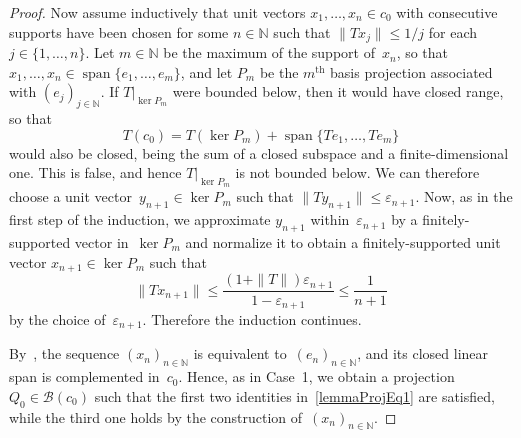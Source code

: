 \documentclass[12pt]{amsart}
\theoremstyle{definition}
\numberwithin{equation}{section}
\begin{document}
\begin{proof}
  Now assume inductively that unit vectors $x_1,\ldots,x_n\in c_0$
  with consecutive supports have been chosen for some $n\in{\ensuremath{\mathbb{N}}}$ such
  that $\|Tx_j\|{\ensuremath{\leqslant}} 1/j$ for each $j\in\{1,\ldots,n\}$. Let $m\in{\ensuremath{\mathbb{N}}}$
  be the maximum of the support of~$x_n$, so that
  $x_1,\ldots,x_n\in\operatorname{span}\{e_1,\ldots,e_m\}$, and let
  $P_m$ be the $m^{\text{th}}$ basis projection associated with
  $(e_j)_{j\in{\ensuremath{\mathbb{N}}}}$.  If $T|_{\ker P_m}$ were bounded below, then it
  would have closed range, so that \[ T(c_0) = T(\ker P_m) +
  \operatorname{span}\{Te_1,\ldots,Te_m\} \] would also be closed,
  being the sum of a closed subspace and a finite-dimensional
  one. This is false, and hence $T|_{\ker P_m}$ is not bounded
  below. We can therefore choose a unit vector~$y_{n+1}\in \ker P_m$
  such that $\| Ty_{n+1}\|{\ensuremath{\leqslant}}{\ensuremath{\varepsilon}}_{n+1}$. Now, as in the first
  step of the induction, we approximate $y_{n+1}$
  within~${\ensuremath{\varepsilon}}_{n+1}$ by a finitely-supported vector in~$\ker P_m$
  and normalize it to obtain a finitely-supported unit vector
  $x_{n+1}\in\ker P_m$ such that \[ \| Tx_{n+1}\|{\ensuremath{\leqslant}}
  \frac{(1+\|T\|){\ensuremath{\varepsilon}}_{n+1}}{1-{\ensuremath{\varepsilon}}_{n+1}}{\ensuremath{\leqslant}} \frac{1}{n+1} \]
  by the choice of~${\ensuremath{\varepsilon}}_{n+1}$.  Therefore the induction
  continues.

  By~\cite[Proposition~2.a.1]{lt1}, the sequence $(x_n)_{n\in{\ensuremath{\mathbb{N}}}}$ is
  equivalent to~$(e_n)_{n\in{\ensuremath{\mathbb{N}}}}$, and its closed linear span is
  complemented in~$c_0$. Hence, as in Case~1, we obtain a projec\-tion
  \mbox{$Q_0\in\mathscr{B}(c_0)$} such that the first two identities
  in~\eqref{lemmaProjEq1} are satisfied, while the third one holds by
  the con\-struc\-tion of~$(x_n)_{n\in{\ensuremath{\mathbb{N}}}}$.
\end{proof}
\end{document}
